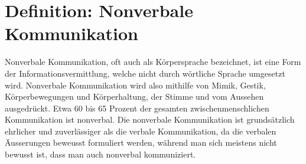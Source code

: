 \section{Definition: Nonverbale Kommunikation}

Nonverbale Kommunikation, oft auch als Körpersprache bezeichnet,
ist eine Form der Informationsvermittlung, welche nicht durch wörtliche Sprache umgesetzt wird.
Nonverbale Kommunikation wird also mithilfe von Mimik, Gestik, Körperbewegungen und Körperhaltung, der Stimme und vom Aussehen ausgedrückt.
Etwa 60 bis 65 Prozent der gesamten zwischenmenschlichen Kommunikation ist nonverbal.
Die nonverbale Kommunikation ist grundsätzlich ehrlicher und zuverlässiger als die verbale Kommunikation,
da die verbalen Äusserungen beweusst formuliert werden, während man sich meistens nicht
bewusst ist, dass man auch nonverbal kommuniziert.
